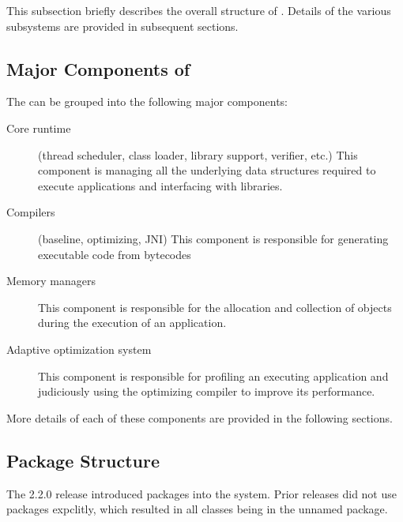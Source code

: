 This subsection briefly describes the overall structure of \jrvm.
Details of the various subsystems are provided in subsequent
sections.  

\subsection{Major Components of \jrvm}


The \jrvm can be grouped into the following major components:
\begin{description}
\item [Core runtime] (thread scheduler, class loader, library support,
verifier, etc.) This component is managing all the underlying data
structures required to execute applications and interfacing with
libraries.

\item [Compilers] (baseline, optimizing, JNI) This component is
responsible for generating executable code from bytecodes

\item [Memory managers] This component is responsible for the
allocation and collection of objects during the execution of an
application. 

\item [Adaptive optimization system] This component is responsible
for profiling an executing application
and judiciously using the optimizing compiler to
improve its performance.
\end{description}

More details of each of these components are provided in the following sections.

\subsection{Package Structure}
The 2.2.0 release introduced packages into the system.  Prior releases
did not use packages expclitly, which resulted in all classes being in
the unnamed package.  

